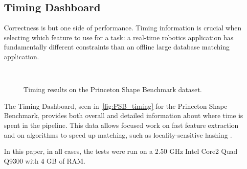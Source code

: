 \subsection{Timing Dashboard}

Correctness is but one side of performance.
Timing information is crucial when selecting which feature to use for a task: a real-time robotics application has fundamentally different constraints than an offline large database matching application.

\begin{figure}[thpb]
\centering
{}
 \\
\vspace{1em}
\caption{Timing results on the Princeton Shape Benchmark dataset.}
\label{fig:PSB_timing}
\end{figure}

The Timing Dashboard, seen in~\autoref{fig:PSB_timing} for the Princeton Shape Benchmark, provides both overall and detailed information about where time is spent in the pipeline.
This data allows focused work on fast feature extraction and on algorithms to speed up matching, such as locality-sensitive hashing \cite{Frome2004}.


In this paper, in all cases, the tests were run on a 2.50 GHz Intel Core2 Quad Q9300 with 4 GB of RAM.

